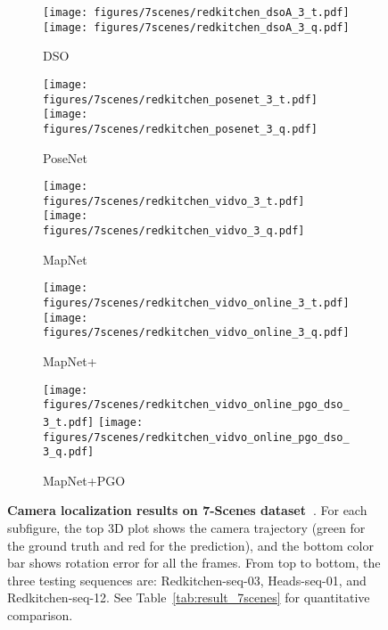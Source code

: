 \begin{figure*}
    \begin{subfigure}{0.19\linewidth}
        \centering
        \texttt{[image: figures/7scenes/redkitchen\_dsoA\_3\_t.pdf]}
        \texttt{[image: figures/7scenes/redkitchen\_dsoA\_3\_q.pdf]}
        \caption{DSO~\cite{Engel2017DSO}}
    \end{subfigure}
    \hfill
    \begin{subfigure}{0.19\linewidth}
        \centering
        \texttt{[image: figures/7scenes/redkitchen\_posenet\_3\_t.pdf]}
        \texttt{[image: figures/7scenes/redkitchen\_posenet\_3\_q.pdf]}
        \caption{PoseNet~\cite{Kendall17cvpr, Kendall15iccv, Kendall16icra}}
    \end{subfigure}
    \hfill
    \begin{subfigure}{0.19\linewidth}
        \centering
        \texttt{[image: figures/7scenes/redkitchen\_vidvo\_3\_t.pdf]}
        \texttt{[image: figures/7scenes/redkitchen\_vidvo\_3\_q.pdf]}
        \caption{MapNet}
    \end{subfigure}
    \hfill
    \begin{subfigure}{0.19\linewidth}
        \centering
        \texttt{[image: figures/7scenes/redkitchen\_vidvo\_online\_3\_t.pdf]}
        \texttt{[image: figures/7scenes/redkitchen\_vidvo\_online\_3\_q.pdf]}
        \caption{MapNet+}
    \end{subfigure}
    \hfill
    \begin{subfigure}{0.19\linewidth}
        \centering
        \texttt{[image: figures/7scenes/redkitchen\_vidvo\_online\_pgo\_dso\_3\_t.pdf]}
        \texttt{[image: figures/7scenes/redkitchen\_vidvo\_online\_pgo\_dso\_3\_q.pdf]}
        \caption{MapNet+PGO}
    \end{subfigure}
    \vspace{-1em}
    \caption{\small \textbf{Camera localization results on 7-Scenes dataset~\cite{Shotton13Scene7}}.
    For each subfigure, the top 3D plot shows the camera trajectory (green for the ground truth and red for the prediction), and the bottom color bar 
    shows rotation error for all the frames. From top to bottom, the three testing sequences are: Redkitchen-seq-03, Heads-seq-01, and Redkitchen-seq-12.
    See Table~\ref{tab:result_7scenes} for quantitative comparison.}
    \label{fig:map_compare}
    \vspace{-1em}
\end{figure*}

